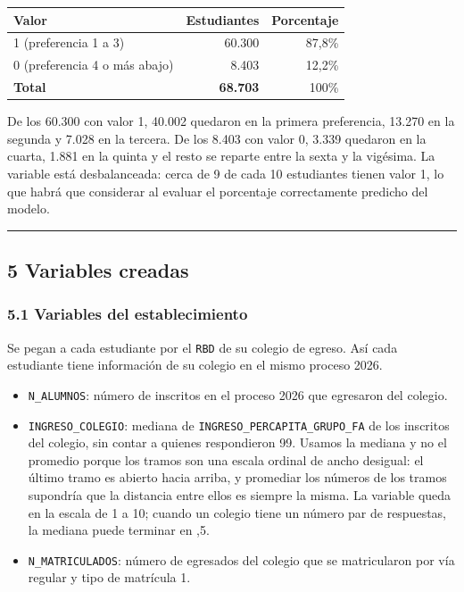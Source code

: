 \documentclass[11pt]{article}
\begin{document}
\begin{center}
\begin{tabular}{lrr}
\toprule
\textbf{Valor} & \textbf{Estudiantes} & \textbf{Porcentaje} \\
\midrule
1 (preferencia 1 a 3)        & 60.300 & 87,8\% \\
0 (preferencia 4 o más abajo) &  8.403 & 12,2\% \\
\midrule
\textbf{Total} & \textbf{68.703} & 100\% \\
\bottomrule
\end{tabular}
\end{center}

De los 60.300 con valor 1, 40.002 quedaron en la primera preferencia,
13.270 en la segunda y 7.028 en la tercera. De los 8.403 con valor 0,
3.339 quedaron en la cuarta, 1.881 en la quinta y el resto se reparte
entre la sexta y la vigésima. La variable está desbalanceada: cerca de
9 de cada 10 estudiantes tienen valor 1, lo que habrá que considerar al
evaluar el porcentaje correctamente predicho del modelo.

\medskip\hrule\medskip

\subsection*{5 \; Variables creadas}

\subsubsection*{5.1 \; Variables del establecimiento}

Se pegan a cada estudiante por el \texttt{RBD} de su colegio de egreso.
Así cada estudiante tiene información de su colegio en el mismo proceso
2026.

\begin{itemize}[leftmargin=1.5em, itemsep=0.3em]
  \item \texttt{N\_ALUMNOS}: número de inscritos en el proceso 2026 que
        egresaron del colegio.
  \item \texttt{INGRESO\_COLEGIO}: mediana de
        \texttt{INGRESO\_PERCAPITA\_GRUPO\_FA} de los inscritos del
        colegio, sin contar a quienes respondieron 99. Usamos la mediana
        y no el promedio porque los tramos son una escala ordinal de
        ancho desigual: el último tramo es abierto hacia arriba, y
        promediar los números de los tramos supondría que la distancia
        entre ellos es siempre la misma. La variable queda en la escala de 1 a
        10; cuando un colegio tiene un número par de respuestas, la
        mediana puede terminar en ,5.
  \item \texttt{N\_MATRICULADOS}: número de egresados del colegio que se
        matricularon por vía regular y tipo de matrícula 1.
\end{itemize}
\end{document}
